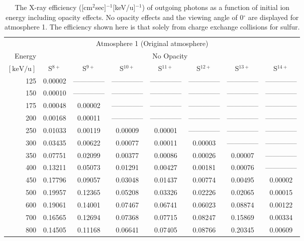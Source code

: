 \begin{table}[ht]
    \centering
    \caption{The X-ray efficiency ([cm$^2$sec]$^{-1}$[keV/u]$^{-1}$) of outgoing photons as a function of initial ion energy including opacity effects. No opacity effects and the viewing angle of 0$^\circ$ are displayed for atmosphere 1. The efficiency shown here is that solely from charge exchange collisions for sulfur.}
    \begin{tabular}{r|c|c|c|c|c|c|c}
    \multicolumn{8}{c}{Atmosphere 1 (Original atmosphere)} \\ \cline{2-8}
    Energy & \multicolumn{7}{c}{No Opacity} \\ \cline{2-8}
    $\mathrm{[keV/u]}$ & S$^{8+}$ & S$^{9+}$ & S$^{10+}$ & S$^{11+}$ & S$^{12+}$ & S$^{13+}$ & S$^{14+}$ \\ \cline{1-8}
      125 & 0.00002 & -------------- & -------------- & -------------- & -------------- & -------------- & -------------- \\
      150 & 0.00010 & -------------- & -------------- & -------------- & -------------- & -------------- & -------------- \\
      175 & 0.00048 & 0.00002 & -------------- & -------------- & -------------- & -------------- & -------------- \\
      200 & 0.00168 & 0.00011 & -------------- & -------------- & -------------- & -------------- & -------------- \\
      250 & 0.01033 & 0.00119 & 0.00009 & 0.00001 & -------------- & -------------- & -------------- \\
      300 & 0.03435 & 0.00622 & 0.00077 & 0.00011 & 0.00003 & -------------- & -------------- \\
      350 & 0.07751 & 0.02099 & 0.00377 & 0.00086 & 0.00026 & 0.00007 & -------------- \\
      400 & 0.13211 & 0.05073 & 0.01291 & 0.00427 & 0.00181 & 0.00076 & -------------- \\
      450 & 0.17796 & 0.09057 & 0.03048 & 0.01437 & 0.00774 & 0.00495 & 0.00002 \\
      500 & 0.19957 & 0.12365 & 0.05208 & 0.03326 & 0.02226 & 0.02065 & 0.00015 \\
      600 & 0.19061 & 0.14001 & 0.07467 & 0.06741 & 0.06023 & 0.08874 & 0.00122 \\
      700 & 0.16565 & 0.12694 & 0.07368 & 0.07715 & 0.08247 & 0.15869 & 0.00334 \\
      800 & 0.14505 & 0.11168 & 0.06641 & 0.07405 & 0.08766 & 0.20345 & 0.00609 \\

\end{tabular}
\end{table}
